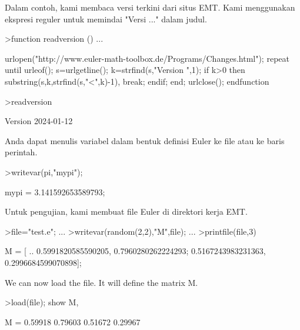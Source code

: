 \documentclass[a4paper,10pt]{article}
\begin{document}
\begin{eulernotebook}
\begin{eulercomment}
\begin{eulercomment}
\begin{eulercomment}
\begin{eulercomment}
\begin{eulercomment}
\begin{eulercomment}
\begin{eulercomment}
\begin{eulercomment}
\begin{eulercomment}
\begin{eulercomment}
\begin{eulercomment}
\begin{eulercomment}
\begin{eulercomment}
\begin{eulercomment}
\begin{eulercomment}
\begin{eulercomment}
\begin{eulercomment}
\begin{eulercomment}
\begin{eulercomment}
Dalam contoh, kami membaca versi terkini dari situs EMT. Kami
menggunakan ekspresi reguler untuk memindai "Versi ..." dalam judul.
\end{eulercomment}
\begin{eulerprompt}
>function readversion () ...
\end{eulerprompt}
\begin{eulerudf}
  urlopen("http://www.euler-math-toolbox.de/Programs/Changes.html");
  repeat
    until urleof();
    s=urlgetline();
    k=strfind(s,"Version ",1);
    if k>0 then substring(s,k,strfind(s,"<",k)-1), break; endif;
  end;
  urlclose();
  endfunction
\end{eulerudf}
\begin{eulerprompt}
>readversion
\end{eulerprompt}
\begin{euleroutput}
  Version 2024-01-12
\end{euleroutput}
\begin{eulercomment}
Anda dapat menulis variabel dalam bentuk definisi Euler ke file atau
ke baris perintah.
\end{eulercomment}
\begin{eulerprompt}
>writevar(pi,"mypi");
\end{eulerprompt}
\begin{euleroutput}
  mypi = 3.141592653589793;
\end{euleroutput}
\begin{eulercomment}
Untuk pengujian, kami membuat file Euler di direktori kerja EMT.
\end{eulercomment}
\begin{eulerprompt}
>file="test.e"; ...
>writevar(random(2,2),"M",file); ...
>printfile(file,3)
\end{eulerprompt}
\begin{euleroutput}
  M = [ ..
  0.5991820585590205, 0.7960280262224293;
  0.5167243983231363, 0.2996684599070898];
\end{euleroutput}
\begin{eulercomment}
We can now load the file. It will define the matrix M.
\end{eulercomment}
\begin{eulerprompt}
>load(file); show M,
\end{eulerprompt}
\begin{euleroutput}
  M = 
    0.59918   0.79603 
    0.51672   0.29967 
\end{euleroutput}

\end{eulercomment}
\end{eulercomment}
\end{eulercomment}
\end{eulercomment}
\end{eulercomment}
\end{eulercomment}
\end{eulercomment}
\end{eulercomment}
\end{eulercomment}
\end{eulercomment}
\end{eulercomment}
\end{eulercomment}
\end{eulercomment}
\end{eulercomment}
\end{eulercomment}
\end{eulercomment}
\end{eulercomment}
\end{eulercomment}
\end{eulernotebook}
\end{document}
